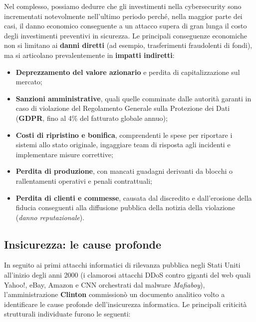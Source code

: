 \documentclass[../../main.tex]{subfiles}
\begin{document}
Nel complesso, possiamo dedurre che gli investimenti nella cybersecurity sono incrementati notevolmente nell'ultimo periodo perché, nella maggior parte dei casi, il danno economico conseguente a un attacco supera di gran lunga il costo degli investimenti preventivi in sicurezza. Le principali conseguenze economiche non si limitano ai \textbf{danni diretti} (ad esempio, trasferimenti fraudolenti di fondi), ma si articolano prevalentemente in \textbf{impatti indiretti}:
\begin{itemize}
    \item \textbf{Deprezzamento del valore azionario} e perdita di capitalizzazione sul mercato;
    \item \textbf{Sanzioni amministrative}, quali quelle comminate dalle autorità garanti in caso di violazione del Regolamento Generale sulla Protezione dei Dati (\textbf{GDPR}, fino al 4\% del fatturato globale annuo);
    \item \textbf{Costi di ripristino e bonifica}, comprendenti le spese per riportare i sistemi allo stato originale, ingaggiare team di risposta agli incidenti e implementare misure correttive;
    \item \textbf{Perdita di produzione}, con mancati guadagni derivanti da blocchi o rallentamenti operativi e penali contrattuali;
    \item \textbf{Perdita di clienti e commesse}, causata dal discredito e dall'erosione della fiducia conseguenti alla diffusione pubblica della notizia della violazione (\textit{danno reputazionale}).
\end{itemize}

\subsection{Insicurezza: le cause profonde}
\label{subsec:cause_profonde}

In seguito ai primi attacchi informatici di rilevanza pubblica negli Stati Uniti all'inizio degli anni 2000 (i clamorosi attacchi DDoS contro giganti del web quali Yahoo!, eBay, Amazon e CNN orchestrati dal malware \textit{Mafiaboy}), l'amministrazione \textbf{Clinton} commissionò un documento analitico volto a identificare le cause profonde dell'insicurezza informatica. Le principali criticità strutturali individuate furono le seguenti:
\end{document}
